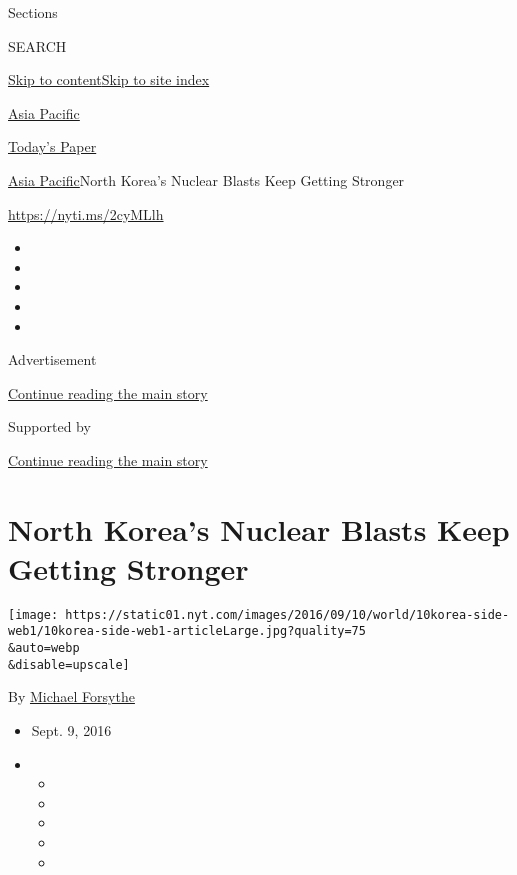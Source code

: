 Sections

SEARCH

\protect\hyperlink{site-content}{Skip to
content}\protect\hyperlink{site-index}{Skip to site index}

\href{https://www.nytimes.com/section/world/asia}{Asia Pacific}

\href{https://myaccount.nytimes.com/auth/login?response_type=cookie\&client_id=vi}{}

\href{https://www.nytimes.com/section/todayspaper}{Today's Paper}

\href{/section/world/asia}{Asia Pacific}\textbar{}North Korea's Nuclear
Blasts Keep Getting Stronger

\url{https://nyti.ms/2cyMLlh}

\begin{itemize}
\item
\item
\item
\item
\item
\end{itemize}

Advertisement

\protect\hyperlink{after-top}{Continue reading the main story}

Supported by

\protect\hyperlink{after-sponsor}{Continue reading the main story}

\hypertarget{north-koreas-nuclear-blasts-keep-getting-stronger}{%
\section{North Korea's Nuclear Blasts Keep Getting
Stronger}\label{north-koreas-nuclear-blasts-keep-getting-stronger}}

\texttt{[image: https://static01.nyt.com/images/2016/09/10/world/10korea-side-web1/10korea-side-web1-articleLarge.jpg?quality=75\\\&auto=webp\\\&disable=upscale]}

By \href{http://www.nytimes.com/by/michael-forsythe}{Michael Forsythe}

\begin{itemize}
\item
  Sept. 9, 2016
\item
  \begin{itemize}
  \item
  \item
  \item
  \item
  \item
  \end{itemize}
\end{itemize}

